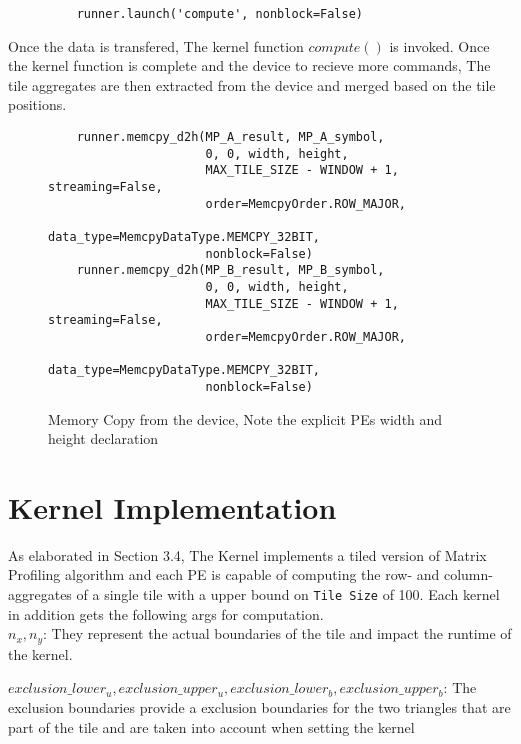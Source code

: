 \begin{figure}[!ht]
    \centering
    \begin{verbatim}
    runner.launch('compute', nonblock=False)
\end{verbatim}
\end{figure}

Once the data is transfered, The kernel function $compute()$ is invoked. Once the kernel function is complete and the device to recieve more commands, The tile aggregates are then extracted from the device and merged based on the tile positions.

\begin{figure}[!ht]
    \centering
    \begin{verbatim}
    runner.memcpy_d2h(MP_A_result, MP_A_symbol,
                      0, 0, width, height,
                      MAX_TILE_SIZE - WINDOW + 1, streaming=False, 
                      order=MemcpyOrder.ROW_MAJOR,
                      data_type=MemcpyDataType.MEMCPY_32BIT,
                      nonblock=False)
    runner.memcpy_d2h(MP_B_result, MP_B_symbol,
                      0, 0, width, height,
                      MAX_TILE_SIZE - WINDOW + 1, streaming=False,
                      order=MemcpyOrder.ROW_MAJOR,
                      data_type=MemcpyDataType.MEMCPY_32BIT,
                      nonblock=False)
\end{verbatim}
\caption{Memory Copy from the device, Note the explicit PEs width and height declaration}\label{code:memcpy_from}
\end{figure}

\section{Kernel Implementation}

As elaborated in Section 3.4, The Kernel implements a tiled version of Matrix Profiling algorithm and each PE is capable of computing the row- and column-aggregates of a single tile with a upper bound on \texttt{Tile Size} of 100. Each kernel in addition gets the following args for computation.\\
\(n_x, n_y\): They represent the actual boundaries of the tile and impact the runtime of the kernel. 

\(exclusion\_lower_u, exclusion\_upper_u, exclusion\_lower_b, exclusion\_upper_b\): The exclusion boundaries provide a exclusion boundaries for the two triangles that are part of the tile and are taken into account when setting the kernel 

